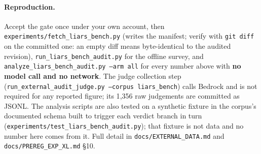 \paragraph{Reproduction.} Accept the gate once under your own account, then \texttt{experiments/fetch\_liars\_bench.py} (writes the manifest; verify with \texttt{git diff} on the committed one: an empty diff means byte-identical to the audited revision), \texttt{run\_liars\_bench\_audit.py} for the offline survey, and \texttt{analyze\_liars\_bench\_audit.py --arm all} for every number above with \textbf{no model call and no network}. The judge collection step (\texttt{run\_external\_audit\_judge.py --corpus liars\_bench}) calls Bedrock and is not required for any reported figure; its 1{,}356 raw judgements are committed as JSONL. The analysis scripts are also tested on a synthetic fixture in the corpus's documented schema built to trigger each verdict branch in turn (\texttt{experiments/test\_liars\_bench\_audit.py}); that fixture is not data and no number here comes from it. Full detail in \texttt{docs/EXTERNAL\_DATA.md} and \texttt{docs/PREREG\_EXP\_XL.md} §10.

